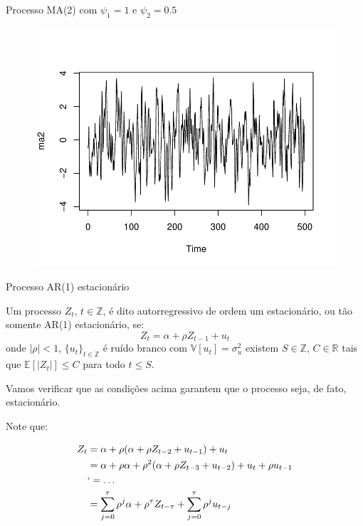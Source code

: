 \documentclass[11pt]{beamer}
\newenvironment{wideitemize}{\itemize\addtolength{\itemsep}{10pt}}{\enditemize}
\begin{document}
\begin{frame}{Processo MA(2) com $\psi_1=1$ e $\psi_2 = 0.5$}
		\begin{figure}
		\includegraphics[scale=0.8]{graficos/ma2.pdf}
	\end{figure}
\end{frame}
\begin{frame}{Processo  AR(1) estacionário}
	\begin{wideitemize}
		\item Um processo $Z_t$, $t \in \mathbb{Z}$, é dito autorregressivo de ordem um estacionário, ou tão somente AR(1) estacionário, se:
		\begin{equation*}
			Z_t = \alpha + \rho Z_{t-1} + u_t
		\end{equation*} 
		onde $|\rho| < 1$, $\{u_t\}_{t \in \mathbb{Z}}$ é ruído branco com $\mathbb{V}[u_t] = \sigma^2_u$ existem $S \in \mathbb{Z}$, $C \in \mathbb{R}$  tais que $\mathbb{E}[|Z_t|] \leq C$ para todo $t \leq S$.
		
		\item Vamos verificar que as condições acima garantem que o processo seja, de fato, estacionário.
		\item Note que:
		
		\begin{equation*}
			\begin{aligned}			
				Z_t &=  \alpha + \rho(\alpha + \rho Z_{t-2} + u_{t-1}) + u_{t}  \\
				    &= \alpha + \rho \alpha  + \rho^2(\alpha + \rho Z_{t-3} + u_{t-2}) + u_{t} + \rho u_{t-1} \\
				     &`= \ldots \\
				     & = \sum_{j=0}^{\tau} \rho^{j} \alpha +  \rho^{\tau} Z_{t-\tau} +  \sum_{j=0}^{\tau} \rho^{j} u_{t-j}\\
			\end{aligned}
		\end{equation*}
		
		

	\end{wideitemize}
\end{frame}
\end{document}
